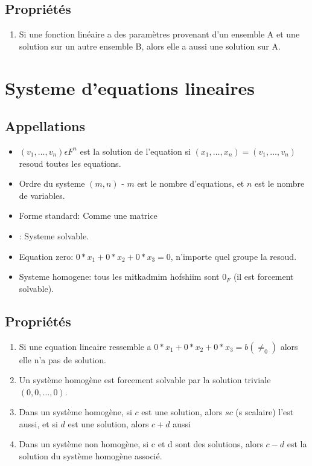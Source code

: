 \documentclass[12pt]{article}
\begin{document}
\subsection{Propriétés}
\begin{enumerate}
  \item Si une fonction linéaire a des paramètres provenant d'un ensemble A et une solution sur un autre ensemble B, alors elle a aussi une solution sur A.
\end{enumerate}

\section{Systeme d'equations lineaires}

\subsection{Appellations}
\begin{itemize}
  \item $(v_1, \ldots, v_n) \epsilon  F^n$ est la solution de l'equation si $(x_1, \ldots, x_n) = (v_1, \ldots, v_n)$ resoud toutes les equations.
  \item  Ordre du systeme $(m, n)$ - $m$ est le nombre d'equations, et $n$ est le nombre de variables.  
    \item Forme standard: Comme une matrice
  \item {}: Systeme solvable.  
    \item  Equation zero: $0*x_1 + 0*x_2 + 0*x_3 = 0$, n'importe quel groupe la resoud.
    \item Systeme homogene: tous les mitkadmim hofshiim sont $0_F$ (il est forcement solvable).
\end{itemize}

\subsection{Propriétés}
\begin{enumerate}
  \item Si une equation lineaire ressemble a $0*x_1 + 0*x_2 + 0*x_3 = b(\neq_0)$ alors elle n'a pas de solution.
  \item  Un système homogène est forcement solvable par la solution triviale $(0, 0,\ldots, 0)$.
  \item Dans un système homogène, si $c$ est une solution, alors  $sc$ (s scalaire) l'est aussi, et si  $d$ est une solution, alors $c + d$ aussi
    \item Dans un système non homogène, si c et d sont des solutions, alors $c-d$ est la solution du système homogène associé.
\end{enumerate}
\end{document}
